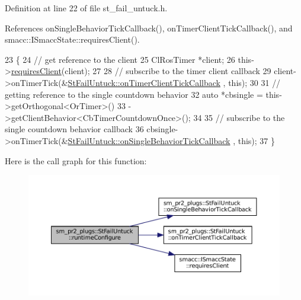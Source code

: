 Definition at line 22 of file st\+\_\+fail\+\_\+untuck.\+h.



References on\+Single\+Behavior\+Tick\+Callback(), on\+Timer\+Client\+Tick\+Callback(), and smacc\+::\+I\+Smacc\+State\+::requires\+Client().


\begin{DoxyCode}
23     \{
24         \textcolor{comment}{// get reference to the client}
25         ClRosTimer *client;
26         this->\hyperlink{classsmacc_1_1ISmaccState_a7f95c9f0a6ea2d6f18d1aec0519de4ac}{requiresClient}(client);
27 
28         \textcolor{comment}{// subscribe to the timer client callback}
29         client->onTimerTick(&\hyperlink{structsm__pr2__plugs_1_1StFailUntuck_a8b5c97b9980e1e8013f78a1e452621e9}{StFailUntuck::onTimerClientTickCallback}
      , \textcolor{keyword}{this});
30 
31         \textcolor{comment}{// getting reference to the single countdown behavior}
32         \textcolor{keyword}{auto} *cbsingle = this->getOrthogonal<OrTimer>()
33                              ->getClientBehavior<CbTimerCountdownOnce>();
34 
35         \textcolor{comment}{// subscribe to the single countdown behavior callback}
36         cbsingle->onTimerTick(&\hyperlink{structsm__pr2__plugs_1_1StFailUntuck_a5aca3bee084f0d3df264ed2d973f291a}{StFailUntuck::onSingleBehaviorTickCallback}
      , \textcolor{keyword}{this});
37     \}
\end{DoxyCode}
Here is the call graph for this function\+:
\nopagebreak
\begin{figure}[H]
\begin{center}
\leavevmode
\includegraphics[width=350pt]{structsm__pr2__plugs_1_1StFailUntuck_af2e650b9c6962deb4740dd3e085a9978_cgraph}
\end{center}
\end{figure}
\mbox{\label{structsm__pr2__plugs_1_1StFailUntuck_abd604f84f00dc9f4e8f9ffaae1f1340b}} 
